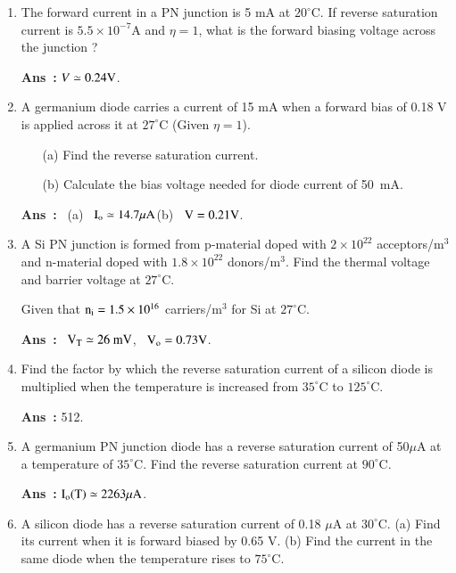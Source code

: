 \begin{enumerate}
\renewcommand{\labelenumi}{(\theenumi)}
\item The forward current in a PN junction is 5 mA at $20^{\circ}$C. If reverse saturation current is $5.5\times 10^{-7}$A and $\eta=1$, what is the forward biasing voltage across the junction ?

\noindent
{\bf Ans~:} $V\simeq 0.24\textrm{V}$.

\item A germanium diode carries a current of 15 mA when a forward bias of 0.18 V is applied across it at $27^{\circ}$C (Given $\eta=1$).
\begin{itemize}
\item[(a)] Find the reverse saturation current.

\item[(b)] Calculate the bias voltage needed for diode current of 50~mA.
\end{itemize}

\noindent
{\bf Ans~:}~ (a)~ $\textrm{I}_{\textrm{o}}\simeq 14.7\mu\textrm{A}$\qquad (b)~ $\textrm{V}=0.21\textrm{V}$.

\item A Si PN junction is formed from p-material doped with $2\times 10^{22}$ acceptors/m$^{3}$ and n-material doped with $1.8\times 10^{22}$ donors/m$^{3}$. Find the thermal voltage and barrier voltage at $27^{\circ}$C.

Given that $\textrm{n}_{\textrm{i}}=1.5\times 10^{16}$ carriers/m$^{3}$ for Si at $27^{\circ}$C.

\smallskip
\noindent
{\bf Ans~:}~ $\textrm{V}_{\textrm{T}}\simeq 26\text{~mV}$, \ $\textrm{V}_{\textrm{o}}=0.73\textrm{V}$.

\item Find the factor by which the reverse saturation current of a silicon diode is multiplied when the temperature is increased from $35^{\circ}$C to $125^{\circ}$C.

\smallskip
\noindent
{\bf Ans~:} 512.

\item A germanium PN junction diode has a reverse saturation current of 50$\mu$A at a temperature of $35^{\circ}$C. Find the reverse saturation current at $90^{\circ}$C.

\smallskip
\noindent
{\bf Ans~:} $\textrm{I}_{\textrm{o}}(\textrm{T})\simeq 2263\mu \textrm{A}$.

\item A silicon diode has a reverse saturation current of 0.18 $\mu$A at $30^{\circ}$C. (a) Find its current when it is forward biased by 0.65 V. (b) Find the current in the same diode when the temperature rises to $75^{\circ}$C.


\end{enumerate}
